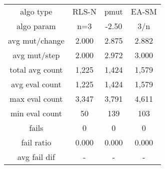 \begin{tabular}[h]{cccc}
algo type&            RLS-N&      pmut&     EA-SM\\
algo param&             n=3&     -2.50&       3/n\\
avg mut/change&       2.000&     2.875&     2.882\\
avg mut/step&         2.000&     2.972&     3.000\\
\hline
total avg count&      1,225&     1,424&     1,579\\
avg eval count&       1,225&     1,424&     1,579\\
max eval count&       3,347&     3,791&     4,611\\
min eval count&          50&       139&       103\\
\hline
fails&                    0&         0&         0\\
fail ratio&           0.000&     0.000&     0.000\\
avg fail dif&             -&         -&         -\\
\end{tabular}

